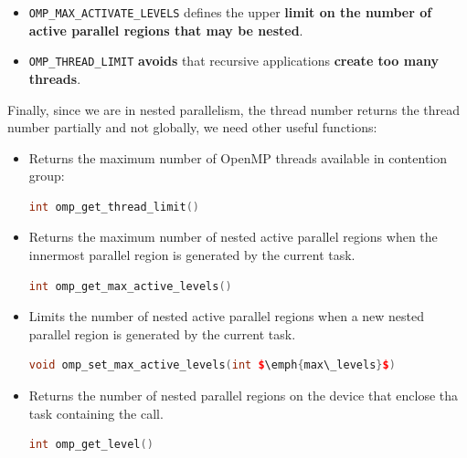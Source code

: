 \begin{itemize}
    \item \texttt{OMP\_MAX\_ACTIVATE\_LEVELS} defines the upper \textbf{limit on the number of active parallel regions that may be nested}.

    \item \texttt{OMP\_THREAD\_LIMIT} \textbf{avoids} that recursive applications \textbf{create too many threads}.
\end{itemize}
Finally, since we are in nested parallelism, the thread number returns the thread number partially and not globally, we need other useful functions:
\begin{itemize}
    \item Returns the maximum number of OpenMP threads available in contention group:
    \begin{openmpbox}
        \begin{lstlisting}[language=C++]
int omp_get_thread_limit()\end{lstlisting}
    \end{openmpbox}

    \item Returns the maximum number of nested active parallel regions when the innermost parallel region is generated by the current task.
    \begin{openmpbox}
        \begin{lstlisting}[language=C++]
int omp_get_max_active_levels()\end{lstlisting}
    \end{openmpbox}
    
    \item Limits the number of nested active parallel regions when a new nested parallel region is generated by the current task.
    \begin{openmpbox}
        \begin{lstlisting}[language=C++]
void omp_set_max_active_levels(int $\emph{max\_levels}$)\end{lstlisting}
    \end{openmpbox}
    
    \newpage

    \item Returns the number of nested parallel regions on the device that enclose tha task containing the call.
    \begin{openmpbox}
        \begin{lstlisting}[language=C++]
int omp_get_level()\end{lstlisting}
    \end{openmpbox}
    

\end{itemize}
